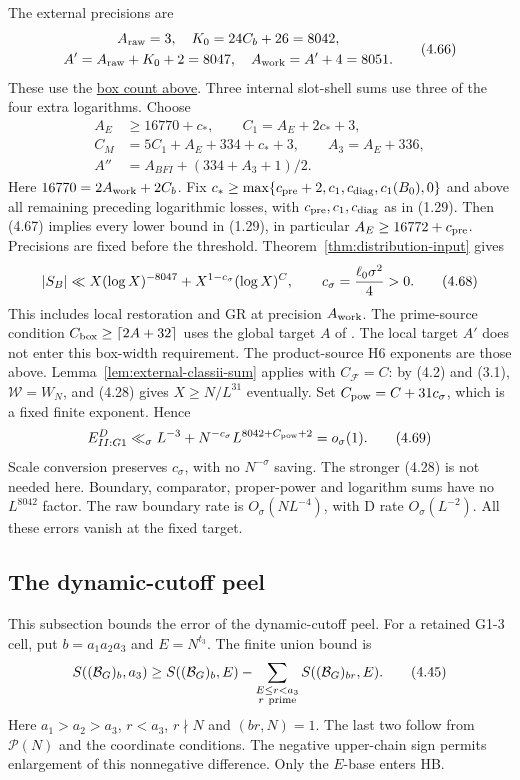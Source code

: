 The external precisions are
\[
\begin{gathered}
 A_{\rm raw}=3,\quad K_0=24C_b+26=8042,\\
 A'=A_{\rm raw}+K_0+2=8047,\quad
 A_{\rm work}=A'+4=8051.
\end{gathered}
 \tag{4.66}
\]
These use the \hyperref[p2:g1-external-count]{box count above}.
Three internal slot-shell sums use three of the four extra logarithms.
Choose
\[
\begin{aligned}
 A_E&\ge16770+c_*,\qquad C_1=A_E+2c_*+3,\\
 C_M&=5C_1+A_E+334+c_*+3,\qquad A_3=A_E+336,\\
 A''&=A_{BFI}+(334+A_3+1)/2.
\end{aligned}
 \tag{4.67}
\]
Here $16770=2A_{\rm work}+2C_b$.
Fix $c_*\ge\max\{c_{\rm pre}+2,c_1,c_{\rm diag},c_1(B_0),0\}$
and above all remaining preceding logarithmic losses, with
$c_{\rm pre},c_1,c_{\rm diag}$ as in (1.29).
Then (4.67) implies every lower bound in (1.29), in particular
$A_E\ge16772+c_{\rm pre}$.
Precisions are fixed before the threshold.
Theorem~\ref{thm:distribution-input} gives
\[
 |S_B|\ll X(\log X)^{-8047}
      +X^{1-c_\sigma}(\log X)^C,\qquad
 c_\sigma={\ell_0\sigma^2\over4}>0.
 \tag{4.68}
\]
This includes local restoration and GR at precision $A_{\rm work}$.
The prime-source condition $C_{\rm box}\ge\lceil2A+32\rceil$ uses
the global target $A$ of \cite[Theorem~1.2]{Z1}.
The local target $A'$ does not enter this box-width requirement.
The product-source H6 exponents are those above.
Lemma~\ref{lem:external-classii-sum} applies with $C_{\mathscr F}=C$:
by (4.2) and (3.1), $\mathcal W=W_N$, and (4.28) gives $X\ge N/L^{31}$ eventually.
Set $C_{\rm pow}=C+31c_\sigma$, which is a fixed finite exponent.
Hence
\[
 E^D_{II:G1}\ll_\sigma L^{-3}
 +N^{-c_\sigma}L^{8042+C_{\rm pow}+2}=o_\sigma(1).
 \tag{4.69}
\]
Scale conversion preserves $c_\sigma$, with no $N^{-\sigma}$ saving.
The stronger (4.28) is not needed here.
Boundary, comparator, proper-power and logarithm sums have no $L^{8042}$ factor.
The raw boundary rate is $O_\sigma(NL^{-4})$, with D rate $O_\sigma(L^{-2})$.
All these errors vanish at the fixed target.

\subsection{The dynamic-cutoff peel}

This subsection bounds the error of the dynamic-cutoff peel.
For a retained G1-3 cell, put $b=a_1a_2a_3$ and $E=N^{t_3}$.
The finite union bound is
\[
 S((\mathcal B_G)_b,a_3)\ge S((\mathcal B_G)_b,E)
       -\sum_{\substack{E\le r<a_3\\r\ {\rm prime}}}
                             S((\mathcal B_G)_{br},E).
 \tag{4.45}
\]
Here $a_1>a_2>a_3$, $r<a_3$, $r\nmid N$ and $(br,N)=1$.
The last two follow from $\mathcal P(N)$ and the coordinate conditions.
The negative upper-chain sign permits enlargement of this nonnegative difference.
Only the $E$-base enters HB.

